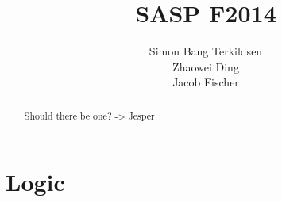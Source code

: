 \documentclass[citeauthoryear]{llncs} %
\title{SASP F2014}
\author{Simon Bang Terkildsen\\Zhaowei Ding\\Jacob Fischer}
\institute{IT University of Copenhagen}
\theoremstyle{definition}
\theoremstyle{notation}
\begin{document}
\maketitle

\begin{abstract}
Should there be one? -> Jesper
\end{abstract}







\section{Logic}








\end{document}
